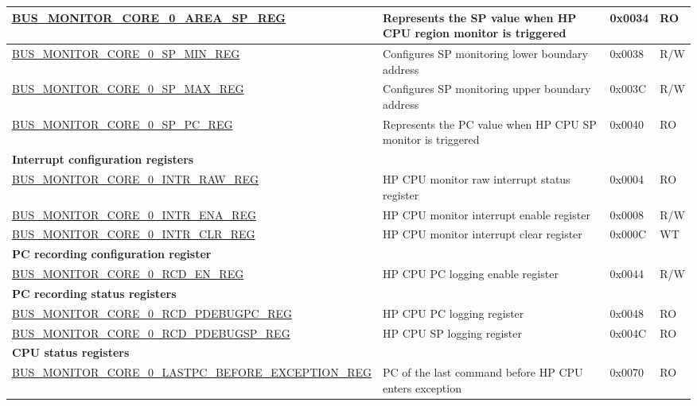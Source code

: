 \begin{longtable}{ |p{9.5cm} | p{11.6cm}| l | l | }
\hyperref[regdesc:BUSMONITORCORE0AREASPREG]{BUS\_MONITOR\_CORE\_0\_AREA\_SP\_REG} & Represents the SP value when HP CPU region monitor is triggered & 0x0034 & RO \\ \hline
\hyperref[regdesc:BUSMONITORCORE0SPMINREG]{BUS\_MONITOR\_CORE\_0\_SP\_MIN\_REG} & Configures SP monitoring lower boundary address & 0x0038 & R/W \\ \hline
\hyperref[regdesc:BUSMONITORCORE0SPMAXREG]{BUS\_MONITOR\_CORE\_0\_SP\_MAX\_REG} & Configures SP monitoring upper boundary address & 0x003C & R/W \\ \hline
\hyperref[regdesc:BUSMONITORCORE0SPPCREG]{BUS\_MONITOR\_CORE\_0\_SP\_PC\_REG} & Represents the PC value when HP CPU SP monitor is triggered & 0x0040 & RO \\ \hline
\multicolumn{4}{|l|}{\textbf{Interrupt configuration registers}} \\ \hline
\hyperref[regdesc:BUSMONITORCORE0INTRRAWREG]{BUS\_MONITOR\_CORE\_0\_INTR\_RAW\_REG} & HP CPU monitor raw interrupt status register & 0x0004 & RO \\ \hline
\hyperref[regdesc:BUSMONITORCORE0INTRENAREG]{BUS\_MONITOR\_CORE\_0\_INTR\_ENA\_REG} & HP CPU monitor interrupt enable register & 0x0008 & R/W \\ \hline
\hyperref[regdesc:BUSMONITORCORE0INTRCLRREG]{BUS\_MONITOR\_CORE\_0\_INTR\_CLR\_REG} & HP CPU monitor interrupt clear register & 0x000C & WT \\ \hline
\multicolumn{4}{|l|}{\textbf{PC recording configuration register}} \\ \hline
\hyperref[regdesc:BUSMONITORCORE0RCDENREG]{BUS\_MONITOR\_CORE\_0\_RCD\_EN\_REG} & HP CPU PC logging enable register & 0x0044 & R/W \\ \hline
\multicolumn{4}{|l|}{\textbf{PC recording status registers}} \\ \hline
\hyperref[regdesc:BUSMONITORCORE0RCDPDEBUGPCREG]{BUS\_MONITOR\_CORE\_0\_RCD\_PDEBUGPC\_REG} & HP CPU PC logging register & 0x0048 & RO \\ \hline
\hyperref[regdesc:BUSMONITORCORE0RCDPDEBUGSPREG]{BUS\_MONITOR\_CORE\_0\_RCD\_PDEBUGSP\_REG} & HP CPU SP logging register & 0x004C & RO \\ \hline
\multicolumn{4}{|l|}{\textbf{CPU status registers}} \\ \hline
\hyperref[regdesc:BUSMONITORCORE0LASTPCBEFOREEXCEPTIONREG]{BUS\_MONITOR\_CORE\_0\_LASTPC\_BEFORE\_EXCEPTION\_REG} & PC of the last command before HP CPU enters exception & 0x0070 & RO \\ \hline

\end{longtable}
